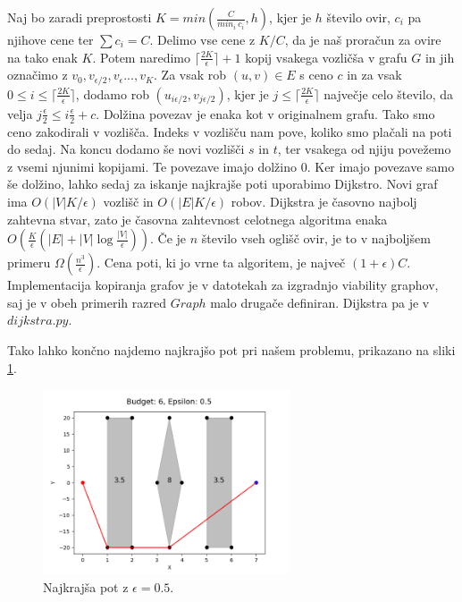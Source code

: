 \documentclass{article}
\begin{document}
Naj bo  zaradi preprostosti $K = min(\frac{C}{min_i \ c_i}, h)$, kjer je $h$ število ovir, $c_i$ pa njihove cene ter $\sum c_i = C$. Delimo vse cene z $K/C$, da je naš proračun za ovire na tako enak $K$. Potem naredimo $ \lceil{\frac{2K}{\epsilon}}\rceil + 1$  kopij vsakega vozličša v grafu $G$ in jih označimo z $v_0, v_{\epsilon/2}, v_{\epsilon}..., v_K$. Za vsak rob $(u, v) \in E$ s ceno $c$ in za vsak $0 \le i \le \lceil{\frac{2K}{\epsilon}}\rceil $, dodamo rob $(u_{i \epsilon/2}, v_{j \epsilon/2})$, kjer je $j\le\lceil{\frac{2K}{\epsilon}}\rceil$ največje celo število, da velja $j\frac{\epsilon}{2}
 \le i \frac{\epsilon}{2} + c$. Dolžina povezav je enaka kot v originalnem grafu. Tako smo ceno zakodirali v vozlišča. Indeks v vozlišču nam pove, koliko smo plačali na poti do sedaj. Na koncu dodamo še novi vozlišči $s$ in $t$, ter vsakega od njiju povežemo z vsemi njunimi kopijami. Te povezave imajo dolžino $0$. Ker imajo povezave samo še dolžino, lahko sedaj za iskanje najkrajše poti uporabimo Dijkstro. Novi graf ima $O(|V|K/\epsilon)$ vozlišč in $O(|E|K/\epsilon)$ robov. Dijkstra  je  časovno najbolj zahtevna stvar, zato je časovna zahtevnost celotnega algoritma enaka $O(\frac{K}{\epsilon}(|E| + |V|\log\frac{|V|}{\epsilon}) )$. Če je $n$ število vseh oglišč ovir, je to v najboljšem primeru $\Omega(\frac{n^3}{\epsilon})$. Cena poti, ki jo vrne ta algoritem, je največ $(1 + \epsilon)C$. Implementacija kopiranja grafov je v datotekah za izgradnjo viability graphov, saj je v obeh primerih razred $Graph$ malo drugače definiran. Dijkstra pa je v $dijkstra.py$.

 Tako lahko končno najdemo najkrajšo pot pri našem problemu, prikazano na sliki \ref{fig:errP1}.

 \begin{figure}[h]
    \centering
    \includegraphics[width=0.65\textwidth]{errPath1.png}
    \caption{Najkrajša pot z $\epsilon = 0.5$.}
    \label{fig:errP1}
\end{figure}
\end{document}
